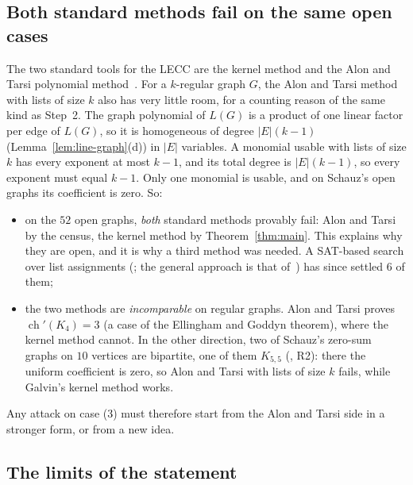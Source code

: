 \documentclass[11pt]{article}
\theoremstyle{plain}
\theoremstyle{definition}
\theoremstyle{remark}
\newcommand{\LG}{L(G)}
\newcommand{\chil}{\operatorname{ch}'}
\begin{document}
\subsection{Both standard methods fail on the same open cases}

The two standard tools for the LECC are the kernel method and the Alon and Tarsi polynomial
method~\cite{at}. For a $k$-regular graph $G$, the Alon and Tarsi method with lists of size $k$
also has very little room, for a counting reason of the same kind as Step~2. The graph
polynomial of $\LG$ is a product of one linear factor per edge of $\LG$, so it is homogeneous of
degree $|E|(k-1)$ (Lemma~\ref{lem:line-graph}(d)) in $|E|$ variables. A monomial usable with lists
of size $k$ has every exponent at most $k-1$, and its total degree is $|E|(k-1)$, so every
exponent must equal $k-1$. Only one monomial is usable, and on Schauz's open graphs its
coefficient is zero. So:
\begin{itemize}
  \item on the $52$ open graphs, \emph{both} standard methods provably fail: Alon and Tarsi by
    the census, the kernel method by Theorem~\ref{thm:main}. This explains why they are open,
    and it is why a third method was needed. A SAT-based search over list assignments
    (; the general approach is that
    of~\cite{kpss}) has since settled $6$ of them;
  \item the two methods are \emph{incomparable} on regular graphs. Alon and Tarsi proves
    $\chil(K_4)=3$ (a case of the Ellingham and Goddyn theorem), where the kernel method cannot. In the
    other direction, two of Schauz's zero-sum graphs on $10$ vertices are bipartite, one of them
    $K_{5,5}$ (, R2): there the uniform coefficient is zero, so
    Alon and Tarsi with lists of size $k$ fails, while Galvin's kernel method works.
\end{itemize}
Any attack on case (3) must therefore start from the Alon and Tarsi side in a stronger form, or
from a new idea.

\subsection{The limits of the statement}
\end{document}
